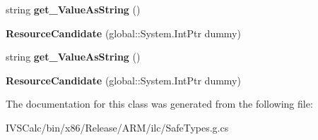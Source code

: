 \begin{DoxyCompactItemize}
string {\bfseries get\+\_\+\+Value\+As\+String} ()
\item 
\mbox{\label{class_windows_1_1_application_model_1_1_resources_1_1_core_1_1_resource_candidate_a97ebb5bb2cdb093389f787117b54b547}} 
{\bfseries Resource\+Candidate} (global\+::\+System.\+Int\+Ptr dummy)
\item 
\mbox{\label{class_windows_1_1_application_model_1_1_resources_1_1_core_1_1_resource_candidate_aff8ddf12870eb4ebe5272b0e6c5d3f62}} 
string {\bfseries get\+\_\+\+Value\+As\+String} ()
\item 
\mbox{\label{class_windows_1_1_application_model_1_1_resources_1_1_core_1_1_resource_candidate_a97ebb5bb2cdb093389f787117b54b547}} 
{\bfseries Resource\+Candidate} (global\+::\+System.\+Int\+Ptr dummy)
\end{DoxyCompactItemize}


The documentation for this class was generated from the following file\+:\begin{DoxyCompactItemize}
\item 
I\+V\+S\+Calc/bin/x86/\+Release/\+A\+R\+M/ilc/Safe\+Types.\+g.\+cs\end{DoxyCompactItemize}
